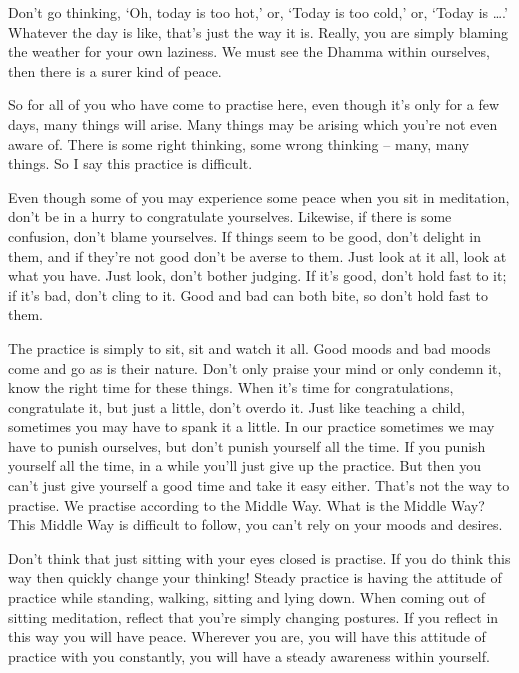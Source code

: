 Don't go thinking, `Oh, today is too hot,' or, `Today is too cold,' or, `Today is \ldots{}.' Whatever the day is like, that's just the way it is. Really, you are simply blaming the weather for your own laziness. We must see the Dhamma within ourselves, then there is a surer kind of peace.

So for all of you who have come to practise here, even though it's only for a few days, many things will arise. Many things may be arising which you're not even aware of. There is some right thinking, some wrong thinking -- many, many things. So I say this practice is difficult.

Even though some of you may experience some peace when you sit in meditation, don't be in a hurry to congratulate yourselves. Likewise, if there is some confusion, don't blame yourselves. If things seem to be good, don't delight in them, and if they're not good don't be averse to them. Just look at it all, look at what you have. Just look, don't bother judging. If it's good, don't hold fast to it; if it's bad, don't cling to it. Good and bad can both bite, so don't hold fast to them.

The practice is simply to sit, sit and watch it all. Good moods and bad moods come and go as is their nature. Don't only praise your mind or only condemn it, know the right time for these things. When it's time for congratulations, congratulate it, but just a little, don't overdo it. Just like teaching a child, sometimes you may have to spank it a little. In our practice sometimes we may have to punish ourselves, but don't punish yourself all the time. If you punish yourself all the time, in a while you'll just give up the practice. But then you can't just give yourself a good time and take it easy either. That's not the way to practise. We practise according to the Middle Way. What is the Middle Way? This Middle Way is difficult to follow, you can't rely on your moods and desires.

Don't think that just sitting with your eyes closed is practise. If you do think this way then quickly change your thinking! Steady practice is having the attitude of practice while standing, walking, sitting and lying down. When coming out of sitting meditation, reflect that you're simply changing postures. If you reflect in this way you will have peace. Wherever you are, you will have this attitude of practice with you constantly, you will have a steady awareness within yourself.

